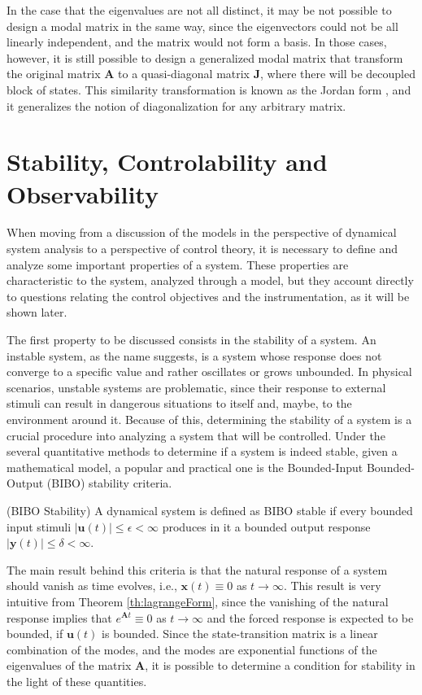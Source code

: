 \documentclass[a4paper,11pt]{book}
\numberwithin{figure}{chapter}
\numberwithin{equation}{chapter}
\numberwithin{table}{chapter}
\theoremstyle{definition}
\newtheorem{definition}{Definition}[chapter]
\newcounter{boxed-theorem}
\newcounter{boxed-definition}
\newenvironment{boxed-definition}[1]
{\begin{shaded} \begin{definition}{#1}}
{\end{definition} \end{shaded}}
\begin{document}
In the case that the eigenvalues are not all distinct, it may be not possible to design a modal matrix in the same way, since the eigenvectors could not be all linearly independent, and the matrix would not form a basis. In those cases, however, it is still possible to design a generalized modal matrix that transform the original matrix $\bm{A}$ to a quasi-diagonal matrix $\bm{J}$, where there will be decoupled block of states. This similarity transformation is known as the Jordan form \cite{Strang:2016}, and it generalizes the notion of diagonalization for any arbitrary matrix.

\section{Stability, Controlability and Observability}

When moving from a discussion of the models in the perspective of dynamical system analysis to a perspective of control theory, it is necessary to define and analyze some important properties of a system. These properties are characteristic to the system, analyzed through a model, but they account directly to questions relating the control objectives and the instrumentation, as it will be shown later.

The first property to be discussed consists in the stability of a system. An instable system, as the name suggests, is a system whose response does not converge to a specific value and rather oscillates or grows unbounded. In physical scenarios, unstable systems are problematic, since their response to external stimuli can result in dangerous situations to itself and, maybe, to the environment around it. Because of this, determining the stability of a system is a crucial procedure into analyzing a system that will be controlled. Under the several quantitative methods to determine if a system is indeed stable, given a mathematical model, a popular and practical one is the Bounded-Input Bounded-Output (BIBO) stability criteria.

\begin{boxed-definition}{(BIBO Stability)}
	A dynamical system is defined as BIBO stable if every bounded input stimuli $| \bm{u}(t) | \leq \epsilon < \infty$ produces in it a bounded output response $| \bm{y}(t) | \leq \delta < \infty$.
\end{boxed-definition}

The main result behind this criteria is that the natural response of a system should vanish as time evolves, i.e., $\bm{x}(t) \equiv 0$ as $t \to \infty$. This result is very intuitive from Theorem \ref{th:lagrangeForm}, since the vanishing of the natural response implies that $e^{\bm{A} t} \equiv 0$ as $t \to \infty$ and the forced response is expected to be bounded, if $\bm{u}(t)$ is bounded. Since the state-transition matrix is a linear combination of the modes, and the modes are exponential functions of the eigenvalues of the matrix $\bm{A}$, it is possible to determine a condition for stability in the light of these quantities.
\end{document}
